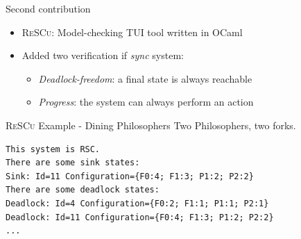 \documentclass{beamer}
\begin{document}
\begin{frame}[fragile]{Second contribution}

	\begin{itemize}
		\item \textsc{ReSCu}: Model-checking TUI tool written in OCaml
		\bigskip
		\item Added two verification if \emph{sync} system:
		\begin{itemize}
			\item \emph{Deadlock-freedom}: a final state is always reachable
			\item \emph{Progress}: the system can always perform an action
		\end{itemize} 
	\end{itemize}
	
\end{frame}

\begin{frame}[fragile]{\textsc{ReSCu} Example - Dining Philosophers}
	Two Philosophers, two forks.

	\bigskip

	\begin{lstlisting}
This system is RSC.
There are some sink states:
Sink: Id=11 Configuration={F0:4; F1:3; P1:2; P2:2}
There are some deadlock states:
Deadlock: Id=4 Configuration={F0:2; F1:1; P1:1; P2:1}
Deadlock: Id=11 Configuration={F0:4; F1:3; P1:2; P2:2}
...
    \end{lstlisting}
\end{frame}
\end{document}
